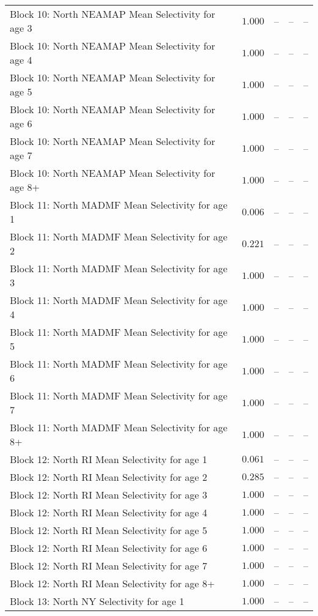 \documentclass[
]{article}
\begin{document}
\begin{landscape}
\begin{longtable}[t]{lrrrr}
Block 10: North NEAMAP Mean Selectivity for age 3 & $1.000$ & -- & -- & --\\
Block 10: North NEAMAP Mean Selectivity for age 4 & $1.000$ & -- & -- & --\\
Block 10: North NEAMAP Mean Selectivity for age 5 & $1.000$ & -- & -- & --\\
Block 10: North NEAMAP Mean Selectivity for age 6 & $1.000$ & -- & -- & --\\
\addlinespace
Block 10: North NEAMAP Mean Selectivity for age 7 & $1.000$ & -- & -- & --\\
Block 10: North NEAMAP Mean Selectivity for age 8+ & $1.000$ & -- & -- & --\\
Block 11: North MADMF Mean Selectivity for age 1 & $0.006$ & -- & -- & --\\
Block 11: North MADMF Mean Selectivity for age 2 & $0.221$ & -- & -- & --\\
Block 11: North MADMF Mean Selectivity for age 3 & $1.000$ & -- & -- & --\\
\addlinespace
Block 11: North MADMF Mean Selectivity for age 4 & $1.000$ & -- & -- & --\\
Block 11: North MADMF Mean Selectivity for age 5 & $1.000$ & -- & -- & --\\
Block 11: North MADMF Mean Selectivity for age 6 & $1.000$ & -- & -- & --\\
Block 11: North MADMF Mean Selectivity for age 7 & $1.000$ & -- & -- & --\\
Block 11: North MADMF Mean Selectivity for age 8+ & $1.000$ & -- & -- & --\\
\addlinespace
Block 12: North RI Mean Selectivity for age 1 & $0.061$ & -- & -- & --\\
Block 12: North RI Mean Selectivity for age 2 & $0.285$ & -- & -- & --\\
Block 12: North RI Mean Selectivity for age 3 & $1.000$ & -- & -- & --\\
Block 12: North RI Mean Selectivity for age 4 & $1.000$ & -- & -- & --\\
Block 12: North RI Mean Selectivity for age 5 & $1.000$ & -- & -- & --\\
\addlinespace
Block 12: North RI Mean Selectivity for age 6 & $1.000$ & -- & -- & --\\
Block 12: North RI Mean Selectivity for age 7 & $1.000$ & -- & -- & --\\
Block 12: North RI Mean Selectivity for age 8+ & $1.000$ & -- & -- & --\\
Block 13: North NY Selectivity for age 1 & $1.000$ & -- & -- & --\\

\end{longtable}
\end{landscape}
\end{document}
